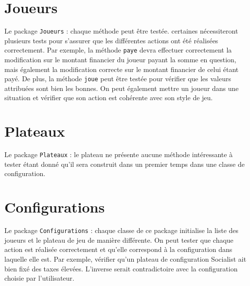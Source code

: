 \documentclass[11pt, a4paper]{report}
\begin{document}
	\section{Joueurs}
	
	Le package \verb|Joueurs| : chaque méthode peut être testée. certaines nécessiteront plusieurs tests pour s'assurer que les différentes actions ont été réalisées correctement. Par exemple, la méthode \verb|paye| devra effectuer correctement la modification sur le montant financier du joueur payant la somme en question, mais également la modification correcte sur le montant financier de celui étant payé. De plus, la méthode \verb|joue| peut être testée pour vérifier que les valeurs attribuées sont bien les bonnes. On peut également mettre un joueur dans une situation et vérifier que son action est cohérente avec son style de jeu.
	
	
	
	\section{Plateaux}
	
	Le package \verb|Plateaux| : le plateau ne présente aucune méthode intéressante à tester étant donné qu'il sera construit dans un premier temps dans une classe de configuration.
	
	
	
	\section{Configurations}
	
	Le package \verb|Configurations| : chaque classe de ce package initialise la liste des joueurs et le plateau de jeu de manière différente. On peut tester que chaque action est réalisée correctement et qu'elle correspond à la configuration dans laquelle elle est. Par exemple, vérifier qu'un plateau de configuration Socialist ait bien fixé des taxes élevées. L'inverse serait contradictoire avec la configuration choisie par l'utilisateur.
	
	
	
\end{document}
